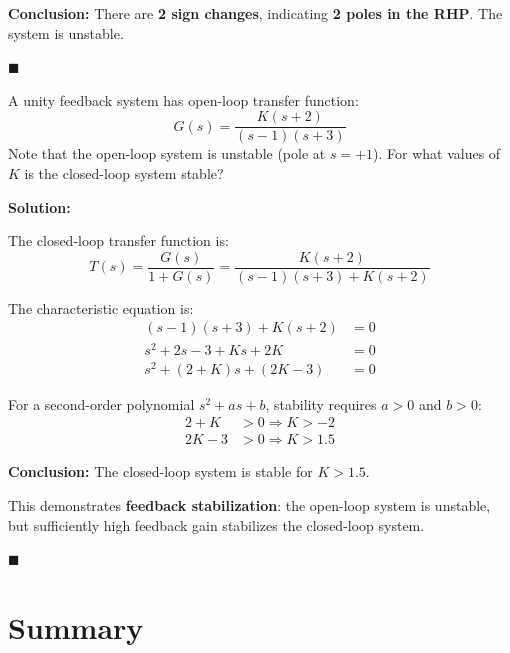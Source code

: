 \textbf{Conclusion:} There are \textbf{2 sign changes}, indicating \textbf{2 poles in the RHP}. The system is unstable.

\hfill $\blacksquare$

\vspace{1em}

\begin{example}
\label{ex:closed_loop}
A unity feedback system has open-loop transfer function:
\begin{equation*}
G(s) = \frac{K(s+2)}{(s-1)(s+3)}
\end{equation*}
Note that the open-loop system is unstable (pole at $s = +1$). For what values of $K$ is the closed-loop system stable?
\end{example}

\textbf{Solution:}

The closed-loop transfer function is:
\begin{equation*}
T(s) = \frac{G(s)}{1+G(s)} = \frac{K(s+2)}{(s-1)(s+3) + K(s+2)}
\end{equation*}

The characteristic equation is:
\begin{align*}
(s-1)(s+3) + K(s+2) &= 0 \\
s^2 + 2s - 3 + Ks + 2K &= 0 \\
s^2 + (2+K)s + (2K-3) &= 0
\end{align*}

For a second-order polynomial $s^2 + as + b$, stability requires $a > 0$ and $b > 0$:
\begin{align*}
2 + K &> 0 \Rightarrow K > -2 \\
2K - 3 &> 0 \Rightarrow K > 1.5
\end{align*}

\textbf{Conclusion:} The closed-loop system is stable for $\boxed{K > 1.5}$.

This demonstrates \textbf{feedback stabilization}: the open-loop system is unstable, but sufficiently high feedback gain stabilizes the closed-loop system.

\hfill $\blacksquare$

\section{Summary}
\label{sec:summary}

